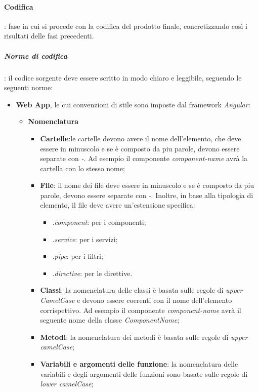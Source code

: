 \paragraph{Codifica}: fase in cui si procede con la codifica del prodotto finale, concretizzando così i risultati delle fasi precedenti.
\subparagraph{Norme di codifica}: il codice sorgente deve essere scritto in modo chiaro e leggibile, seguendo le seguenti norme:
\begin{itemize}
    \item \textbf{Web App}, le cui convenzioni di stile sono imposte dal framework \textit{Angular}:
    \begin{itemize}
        \item \textbf{Nomenclatura}
        \begin{itemize}
            \item \textbf{Cartelle}:le cartelle devono avere il nome dell'elemento, che deve essere in minuscolo e se è composto da piu parole, devono essere separate con \textit{-}. \newline
            Ad esempio il componente \textit{component-name} avrà la cartella con lo stesso nome;
            \item \textbf{File}: il nome dei file deve essere in minuscolo e se è composto da piu parole, devono essere separate con \textit{-}. \newline
            Inoltre, in base alla tipologia di elemento, il file deve avere un'estensione specifica:
            \begin{itemize}
                \item \textit{.component}: per i componenti;
                \item \textit{.service}: per i servizi;
                \item \textit{.pipe}: per i filtri;
                \item \textit{.directive}: per le direttive.
            \end{itemize}
            \item \textbf{Classi}: la nomenclatura delle classi è basata sulle regole di \textit{upper CamelCase} e devono essere coerenti con il nome dell'elemento corrispettivo. \newline
            Ad esempio il componente \textit{component-name} avrà il seguente nome della classe \textit{ComponentName};
            \item \textbf{Metodi}: la nomenclatura dei metodi è basata sulle regole di \textit{upper camelCase};
            \item \textbf{Variabili e argomenti delle funzione}: la nomenclatura delle variabili e degli argomenti delle funzioni sono basate sulle regole di \textit{lower camelCase};

\end{itemize}
\end{itemize}
\end{itemize}
